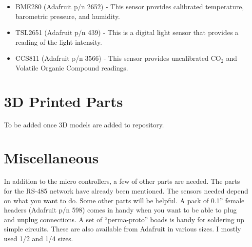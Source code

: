 \documentclass[10pt, openany, draft]{article}
\begin{document}
\begin{itemize}
  \item BME280 (Adafruit p/n 2652) - This sensor provides calibrated temperature, barometric pressure, and humidity.
  \item TSL2651 (Adafruit p/n 439) - This is a digital light sensor that provides a reading of the light intensity.
  \item CCS811 (Adafruit p/n 3566) - This sensor provides uncalibrated CO$_2$ and Volatile Organic Compound readings.
\end{itemize}

\section{3D Printed Parts}
To be added once 3D models are added to repository.

\section{Miscellaneous}
In addition to the micro controllers, a few of other parts are needed.  The parts for the RS-485 network have already been mentioned.  The sensors needed depend on what you want to do.  Some other parts will be helpful.  A pack of 0.1'' female headers (Adafruit p/n 598) comes in handy when you want to be able to plug and unplug connections.  A set of ``perma-proto'' boads is handy for soldering up simple circuits.  These are also available from Adafruit in various sizes.  I mostly used 1/2 and 1/4 sizes.
\end{document}
